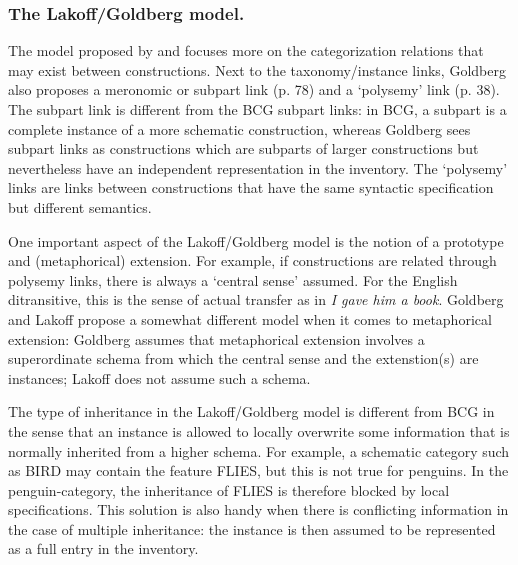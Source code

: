 \subsubsection{The Lakoff/Goldberg model.}
The model proposed by \citet{lakoff87woman} and \citet{goldberg95construction} focuses more on the categorization relations that may exist between constructions. Next to the taxonomy/instance links, Goldberg also proposes a meronomic or subpart link (p. 78) and a `polysemy' link (p. 38). The subpart link is different from the BCG subpart links: in BCG, a subpart is a complete instance of a more schematic construction, whereas Goldberg sees subpart links as constructions which are subparts of larger constructions but nevertheless have an independent representation in the inventory. The `polysemy' links are links between constructions that have the same syntactic specification but different semantics.

One important aspect of the Lakoff/Goldberg model is the notion of a prototype and (metaphorical) extension. For example, if constructions are related through polysemy links, there is always a `central sense' assumed. For the English ditransitive, this is the sense of actual transfer as in {\em I gave him a book}. Goldberg and Lakoff propose a somewhat different model when it comes to metaphorical extension: Goldberg assumes that metaphorical extension involves a superordinate schema from which the central sense and the extenstion(s) are instances; Lakoff does not assume such a schema.

The type of inheritance in the Lakoff/Goldberg model is different from BCG in the sense that an instance is allowed to locally overwrite some information that is normally inherited from a higher schema. For example, a schematic category such as BIRD may contain the feature FLIES, but this is not true for penguins. In the penguin-category, the inheritance of FLIES is therefore blocked by local specifications. This solution is also handy when there is conflicting information in the case of multiple inheritance: the instance is then assumed to be represented as a full entry in the inventory.


